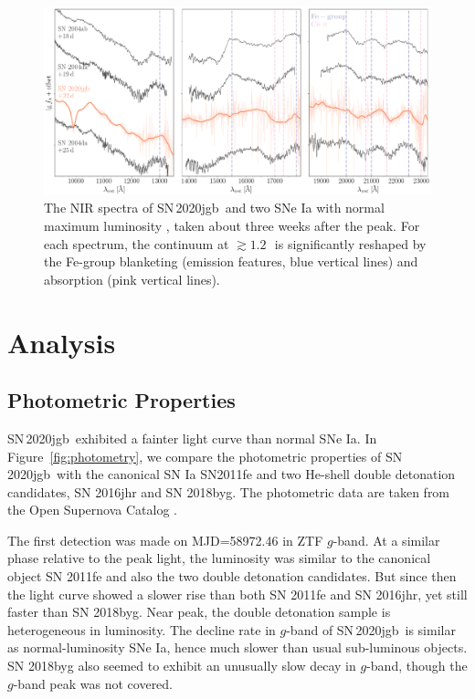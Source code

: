 \documentclass[twocolumn]{aastex631}
\newcommand\sn{SN\,2020jgb}
\begin{document}
\begin{figure}
    \centering
    \includegraphics[width=\textwidth]{NIR_spec.pdf}
    \caption{The NIR spectra of \sn\ and two SNe Ia with normal maximum luminosity \citep[SN 2004ab and SN 2004da,][]{Marion2009_NIR}, taken about three weeks after the peak. For each spectrum, the continuum at $\gtrsim1.2$\,\micron\  is significantly reshaped by the Fe-group blanketing (emission features, blue vertical lines) and  absorption (pink vertical lines).}
    \label{fig:NIR_spec}
\end{figure}

\section{Analysis} \label{sec:analysis}
\subsection{Photometric Properties}
\sn\ exhibited a fainter light curve than normal SNe Ia. In Figure~\ref{fig:photometry}, we compare the photometric properties of \sn\ with the canonical SN Ia SN2011fe \citep{Nugent_11fe_2011} and two He-shell double detonation candidates, SN 2016jhr and SN 2018byg. The photometric data are taken from the Open Supernova Catalog \citep{Guillochon_2017}.

The first detection was made on MJD=58972.46 in ZTF $g$-band. At a similar phase relative to the peak light, the luminosity was similar to the canonical object SN 2011fe and also the two double detonation candidates. But since then the light curve showed a slower rise than both SN 2011fe and SN 2016jhr, yet still faster than SN 2018byg. Near peak, the double detonation sample is heterogeneous in luminosity. The decline rate in $g$-band of \sn\ is similar as normal-luminosity SNe Ia, hence much slower than usual sub-luminous objects. SN 2018byg also seemed to exhibit an unusually slow decay in $g$-band, though the $g$-band peak was not covered.
\end{document}

